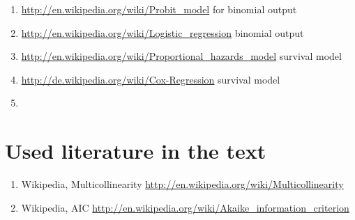 \documentclass{article}
\begin{document}
\begin{enumerate}
		\begin{enumerate}
			\item \textcolor{black}{\url{http://en.wikipedia.org/wiki/Probit_model}} for binomial output
			\item \textcolor{black}{\url{http://en.wikipedia.org/wiki/Logistic_regression}}	binomial output
			\item \textcolor{black}{\url{http://en.wikipedia.org/wiki/Proportional_hazards_model}} survival model 
			\item \textcolor{black}{\url{http://de.wikipedia.org/wiki/Cox-Regression}} survival model
			\item \textcolor{black}{\url{}}
		\end{enumerate}
\end{enumerate}
\section*{Used literature in the text}
\begin{enumerate}
	\item Wikipedia, Multicollinearity \url{http://en.wikipedia.org/wiki/Multicollinearity}
	\item Wikipedia, AIC \url{http://en.wikipedia.org/wiki/Akaike_information_criterion}
\end{enumerate}
\end{document}
